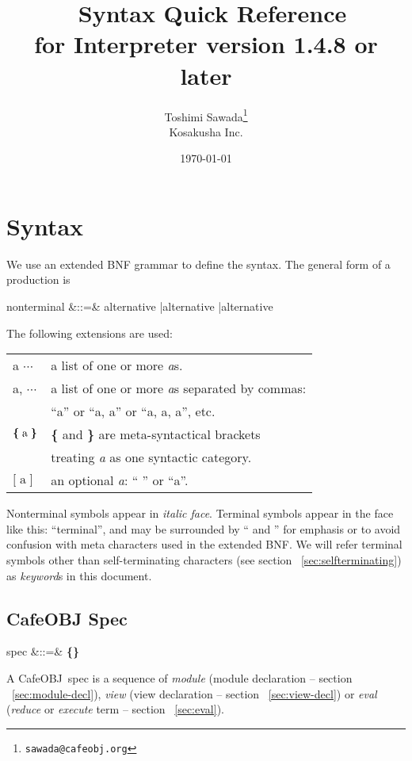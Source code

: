 \documentclass[a4paper]{article}
\title{\cafeobj\ Syntax Quick Reference \\
  {\small for Interpreter version 1.4.8 or later}}
\date{\today}
\author{Toshimi Sawada\thanks{\texttt{sawada@cafeobj.org}} \\
  Kosakusha Inc.
  }
\newenvironment{fminipage}%
{\begin{Sbox}\begin{minipage}}%
{\end{minipage}\end{Sbox}\fbox{\TheSbox}}
\def\cafeobj{\textsf{CafeOBJ}}
\def\sym#1{\textsf{#1}\null}
\def\nonterm#1{\textit{#1}\null}
\def\alt{{\;|\;}}
\def\seqof#1{\mbox{\textbf{\{}}\;{#1}\;\mbox{\textbf{\}}}}
\def\optn#1{\textbf{[}\;{#1}\;\textbf{]}}
\def\synindent{\;\;\;}
\begin{document}
\maketitle
\tableofcontents
%
\setlength{\parindent}{0pt}
\setlength{\parskip}{1.4ex}
\section{Syntax}
\label{sec:cafeobj-syntax}

We use an extended BNF grammar to define the syntax. The general form
of a production is
\begin{syntax}
\synindent\synindent  nonterminal &::=& alternative \alt alternative \alt \cdots \alt alternative
\end{syntax}

The following extensions are used:
\begin{center}
\begin{fminipage}{0.7\textwidth}
  \begin{tabular}{ll}
    a $\cdots$ & a list of one or more \textit{a}s. \\
    a, $\cdots$ & a list of one or more \textit{a}s separated by commas: \\
    & ``a'' or ``a, a'' or ``a, a, a'', etc. \\
    $\seqof{\textrm{a}}$ & \textbf{\{} and \textbf{\}} are meta-syntactical
    brackets \\ 
    & treating \textit{a} as one syntactic category. \\
    $\optn{\textrm{a}}$ & an optional \textit{a}: `` '' or ``a''.
  \end{tabular}
\end{fminipage}
\end{center}
Nonterminal symbols appear in \textit{italic face}. Terminal symbols
appear in the face like this: ``\sym{terminal}'', and may be
surrounded by `` and '' for emphasis or to avoid confusion
with meta characters used in the extended BNF. We will refer terminal
symbols other than self-terminating characters (see section
~\ref{sec:selfterminating}) as \textit{keyword}s in this document.

\subsection{CafeOBJ Spec}
\label{sec:cafeobjprogram}
\begin{syntax}
  \synindent\synindent spec &::=& \seqof{module \alt view \alt eval} \cdots
\end{syntax}
A \cafeobj\ spec is a sequence of \nonterm{module} (module declaration
-- section ~\ref{sec:module-decl}), \nonterm{view} (view declaration -- 
section ~\ref{sec:view-decl}) or \nonterm{eval} (\textit{reduce} or
\textit{execute} term -- section ~\ref{sec:eval}).
\end{document}
